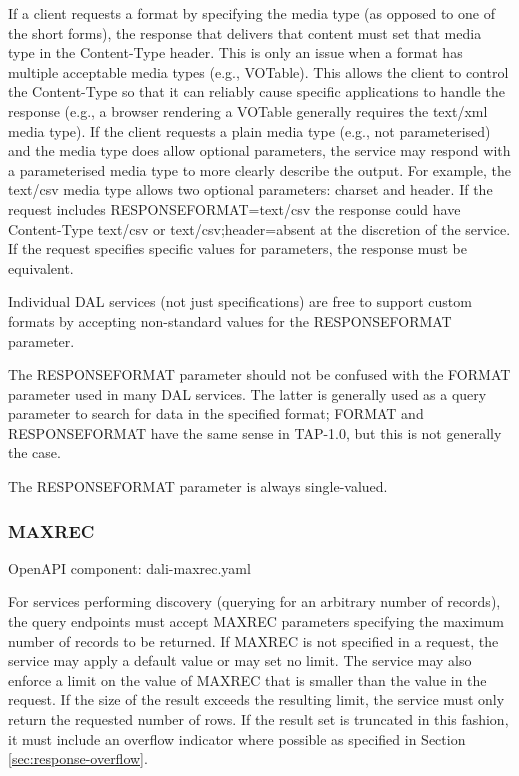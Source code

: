 \documentclass[11pt,letter]{ivoa}
\begin{document}
If a client requests a format by specifying the media type (as opposed to one of
the short forms), the response that delivers that content must set that
media type
in the Content-Type header. This is only an issue when a format has multiple
acceptable media types (e.g., VOTable). This allows the client to control the
Content-Type so that it can reliably cause specific applications to handle the
response (e.g., a browser rendering a VOTable generally requires the text/xml
media type). If the client requests a plain media type (e.g., not parameterised) and
the media type does allow optional parameters, the service may respond with a
parameterised media type to more clearly describe the output. For example, the
text/csv media type allows two optional parameters: charset and header. If the
request includes RESPONSEFORMAT=text/csv the response could have Content-Type
text/csv or text/csv;header=absent at the discretion of the service. If the
request specifies specific values for parameters, the response must be
equivalent.

Individual DAL services (not just specifications) are free to support custom
formats by accepting non-standard values for the RESPONSEFORMAT parameter.

The RESPONSEFORMAT parameter should not be confused with the FORMAT parameter
used in many DAL services. The latter is generally used as a query parameter to
search for data in the specified format; FORMAT and RESPONSEFORMAT have the same
sense in TAP-1.0, but this is not generally the case.

The RESPONSEFORMAT parameter is always single-valued.

\subsubsection{MAXREC}
\label{sec:MAXREC}
OpenAPI component: dali-maxrec.yaml

For services performing discovery (querying for an arbitrary number of
records), the query endpoints must accept MAXREC parameters specifying the maximum
number of records to be returned. If MAXREC is not specified in a request, the
service may apply a default value or may set no limit. The service may also
enforce a limit on the value of MAXREC that is smaller than the value in the
request. If the size of the result exceeds the resulting limit, the service must
only return the requested number of rows. If the result set is truncated in this
fashion, it must include an overflow indicator where possible as specified in Section \ref{sec:response-overflow}.
\end{document}
